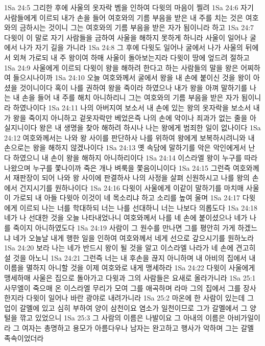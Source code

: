 1Sa 24:5  그리한 후에 사울의 옷자락 벰을 인하여 다윗의 마음이 찔려
1Sa 24:6  자기 사람들에게 이르되 내가 손을 들어 여호와의 기름 부음을 받은 내 주를 치는 것은 여호와의 금하시는 것이니 그는 여호와의 기름 부음을 받은 자가 됨이니라 하고
1Sa 24:7  다윗이 이 말로 자기 사람들을 금하여 사울을 해하지 못하게 하니라 사울이 일어나 굴에서 나가 자기 길을 가니라
1Sa 24:8  그 후에 다윗도 일어나 굴에서 나가 사울의 뒤에서 외쳐 가로되 내 주 왕이여 하매 사울이 돌아보는지라 다윗이 땅에 엎드려 절하고
1Sa 24:9  사울에게 이르되 다윗이 왕을 해하려 한다고 하는 사람들의 말을 왕은 어찌하여 들으시나이까
1Sa 24:10  오늘 여호와께서 굴에서 왕을 내 손에 붙이신 것을 왕이 아셨을 것이니이다 혹이 나를 권하여 왕을 죽이라 하였으나 내가 왕을 아껴 말하기를 나는 내 손을 들어 내 주를 해치 아니하리니 그는 여호와의 기름 부음을 받은 자가 됨이니라 하였나이다
1Sa 24:11  나의 아버지여 보소서 내 손에 있는 왕의 옷자락을 보소서 내가 왕을 죽이지 아니하고 겉옷자락만 베었은즉 나의 손에 악이나 죄과가 없는 줄을 아실지니이다 왕은 내 생명을 찾아 해하려 하시나 나는 왕에게 범죄한 일이 없나이다
1Sa 24:12  여호와께서는 나와 왕 사이를 판단하사 나를 위하여 왕에게 보복하시려니와 내 손으로는 왕을 해하지 않겠나이다
1Sa 24:13  옛 속담에 말하기를 악은 악인에게서 난다 하였으니 내 손이 왕을 해하지 아니하리이다
1Sa 24:14  이스라엘 왕이 누구를 따라 나왔으며 누구를 쫓나이까 죽은 개나 벼룩을 쫓음이니이다
1Sa 24:15  그런즉 여호와께서 재판장이 되어 나와 왕 사이에 판결하사 나의 사정을 살펴 신원하시고 나를 왕의 손에서 건지시기를 원하나이다
1Sa 24:16  다윗이 사울에게 이같이 말하기를 마치매 사울이 가로되 내 아들 다윗아 이것이 네 목소리냐 하고 소리를 높여 울며
1Sa 24:17  다윗에게 이르되 나는 너를 학대하되 너는 나를 선대하니 너는 나보다 의롭도다
1Sa 24:18  네가 나 선대한 것을 오늘 나타내었나니 여호와께서 나를 네 손에 붙이셨으나 네가 나를 죽이지 아니하였도다
1Sa 24:19  사람이 그 원수를 만나면 그를 평안히 가게 하겠느냐 네가 오늘날 내게 행한 일을 인하여 여호와께서 네게 선으로 갚으시기를 원하노라
1Sa 24:20  보라 나는 네가 반드시 왕이 될 것을 알고 이스라엘 나라가 네 손에 견고히 설 것을 아노니
1Sa 24:21  그런즉 너는 내 후손을 끊지 아니하며 내 아비의 집에서 내 이름을 멸하지 아니할 것을 이제 여호와로 내게 맹세하라
1Sa 24:22  다윗이 사울에게 맹세하매 사울은 집으로 돌아가고 다윗과 그의 사람들은 요새로 올라가니라
1Sa 25:1  사무엘이 죽으매 온 이스라엘 무리가 모여 그를 애곡하며 라마 그의 집에서 그를 장사한지라 다윗이 일어나 바란 광야로 내려가니라
1Sa 25:2  마온에 한 사람이 있는데 그 업이 갈멜에 있고 심히 부하여 양이 삼천이요 염소가 일천이므로 그가 갈멜에서 그 양털을 깎고 있었으니
1Sa 25:3  그 사람의 이름은 나발이요 그 아내의 이름은 아비가일이라 그 여자는 총명하고 용모가 아름다우나 남자는 완고하고 행사가 악하며 그는 갈멜 족속이었더라
